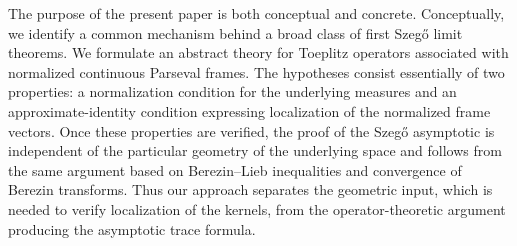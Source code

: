 \documentclass{amsart}
\theoremstyle{definition}
\theoremstyle{remark}
\numberwithin{equation}{section}
\newcommand{\ip}[2]{\left\langle {#1} , {#2} \right\rangle} %
\newcommand{\R}{\mathbb{R}} %
\begin{document}

The purpose of the present paper is both conceptual and concrete. Conceptually, we identify a common mechanism behind a broad class of first Szeg\H{o} limit theorems. We formulate an abstract theory for Toeplitz operators associated with normalized continuous Parseval frames. The hypotheses consist essentially of two properties: a normalization condition for the underlying measures and an approximate-identity condition expressing localization of the normalized frame vectors. Once these properties are verified, the proof of the Szeg\H{o} asymptotic is independent of the particular geometry of the underlying space and follows from the same argument based on Berezin--Lieb inequalities and convergence of Berezin transforms. Thus our approach separates the geometric input, which is needed to verify localization of the kernels, from the operator-theoretic argument producing the asymptotic trace formula.
\end{document}
